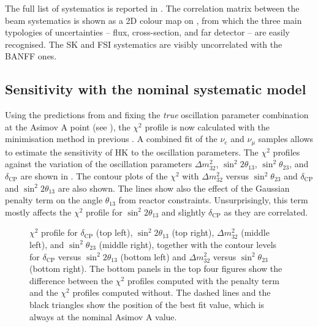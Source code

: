 The full list of systematics is reported in .
The correlation matrix between the beam systematics is shown as a 2D colour map on , %
from which the three main typologies of uncertainties -- flux, cross-section, and far detector -- %
are easily recognised.
The SK and FSI systematics are visibly uncorrelated with the BANFF ones.



\subsection{Sensitivity with the nominal systematic model}
\label{sec:nominal}

Using the predictions from  and fixing the \emph{true} oscillation parameter %
combination at the Asimov A point (see ), %
the $\chi^2$ profile is now calculated with the minimisation method in previous .
A combined fit of the $\nu_e$ and $\nu_\mu$ samples allows to estimate the sensitivity of HK %
to the oscillation parameters.
The $\chi^2$ profiles against the variation of the oscillation parameters %
$\Delta m^2_{32}$, $\sin^2 2\theta_{13}$, $\sin^2 \theta_{23}$, and $\delta_\text{CP}$ %
are shown in .
The contour plots of the $\chi^2$ with $\Delta m_{32}^2$ versus $\sin^2\theta_{23}$ and %
$\delta_\text{CP}$ and $\sin^2 2\theta_{13}$ are also shown.
The lines show also the effect of the Gaussian penalty term on the angle $\theta_{13}$ from reactor constraints.
Unsurprisingly, this term mostly affects the $\chi^2$ profile for $\sin^2 2\theta_{13}$ and slightly $\delta_\text{CP}$ %
as they are correlated.

\begin{figure}
	\centering
	\resizebox{0.49\linewidth}{!}{}
	\resizebox{0.49\linewidth}{!}{}
	\resizebox{0.49\linewidth}{!}{}
	\resizebox{0.49\linewidth}{!}{}
	\resizebox{0.49\linewidth}{!}{}	%
	\resizebox{0.49\linewidth}{!}{}	%
	\caption[$\chi^2$ profiles for $\Delta m_{32}^2$, $\sin^2 2\theta_{13}$, and $\sin\theta_{23}$ with the nominal systematic model]%
		{$\chi^2$ profile for $\delta_\text{CP}$ (top left), $\sin^2 2\theta_{13}$ (top right), %
		$\Delta m_{32}^2$ (middle left), and $\sin^2 \theta_{23}$ (middle right), %
		together with the contour levels for $\delta_\text{CP}$ versus $\sin^2 2\theta_{13}$ (bottom left) %
		and $\Delta m_{32}^2$ versus $\sin^2 \theta_{23}$ (bottom right).
		The bottom panels in the top four figures show the difference between the $\chi^2$ profiles computed %
		with the penalty term and the $\chi^2$ profiles computed without.
		The dashed lines and the black triangles show the position of the best fit value, %
		which is always at the nominal Asimov A value.}
	\label{fig:nominal_profile}
\end{figure}


